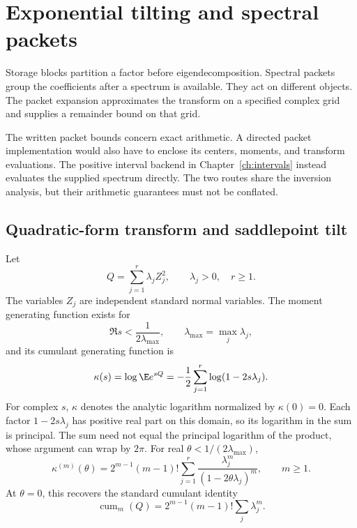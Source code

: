 \chapter{Exponential tilting and spectral packets}\label{ch:packets}
\label{sec:packets}
Storage blocks partition a factor before eigendecomposition. Spectral packets
group the coefficients after a spectrum is available. They act on different
objects. The packet expansion approximates the transform on a specified
complex grid and supplies a remainder bound on that grid.

The written packet bounds concern exact arithmetic. A directed packet implementation would also have to enclose its centers, moments, and transform evaluations. The positive interval backend in Chapter~\ref{ch:intervals} instead evaluates the supplied spectrum directly. The two routes share the inversion analysis, but their arithmetic guarantees must not be conflated.

\section{Quadratic-form transform and saddlepoint tilt}

Let
\begin{equation}
Q=\sum_{j=1}^{r}\lambda_j Z_j^2,
\qquad \lambda_j>0,\quad r\ge1.
\label{eq:Q}
\end{equation}
The variables $Z_j$ are independent standard normal variables.
The moment generating function exists for
\[
\Re s < \frac{1}{2\lambda_{\max}},
\qquad
\lambda_{\max}=\max_j\lambda_j,
\]
and its cumulant generating function is
\begin{equation}
\kappa(s)=\log \E e^{sQ}
=-\frac12\sum_{j=1}^{r}\log(1-2s\lambda_j).
\label{eq:cgf}
\end{equation}
For complex $s$, $\kappa$ denotes the analytic logarithm normalized by
$\kappa(0)=0$. Each factor $1-2s\lambda_j$ has positive real part on this
domain, so its logarithm in the sum is principal. The sum need not equal the
principal logarithm of the product, whose argument can wrap by $2\pi$.
For real $\theta<1/(2\lambda_{\max})$,
\begin{equation}
\kappa^{(m)}(\theta)
=2^{m-1}(m-1)!\sum_{j=1}^{r}
\frac{\lambda_j^m}{(1-2\theta\lambda_j)^m},
\qquad m\ge1.
\label{eq:derivatives}
\end{equation}
At $\theta=0$, this recovers the standard cumulant identity
\[
\operatorname{cum}_m(Q)=2^{m-1}(m-1)!\sum_j\lambda_j^m.
\]

